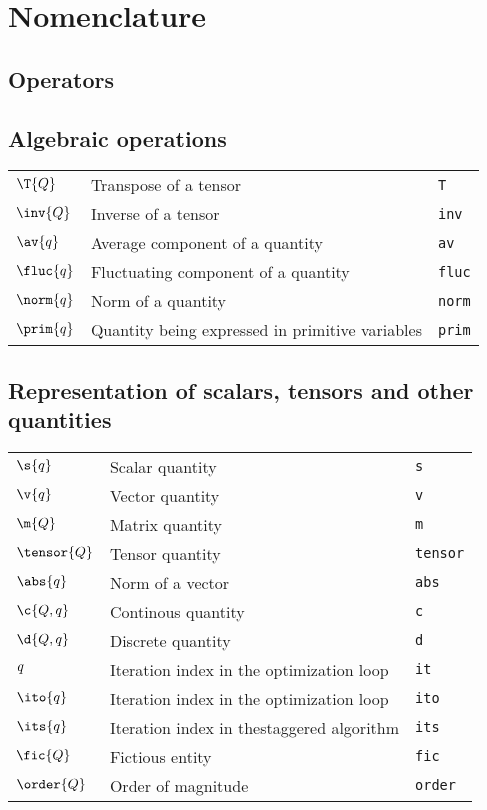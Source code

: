 \section*{Nomenclature}\label{sec:nomenclature}

\subsection*{Operators}

\subsection*{Algebraic operations}
\begin{tabular}{l l l}
$\T{Q}$ & Transpose of a tensor& \texttt{T}\\
$\inv{Q}$ & Inverse of a tensor& \texttt{inv}\\
$\av{q}$ & Average component of a quantity& \texttt{av}\\
$\fluc{q}$ & Fluctuating component of a quantity& \texttt{fluc}\\
$\norm{q}$ & Norm of a quantity& \texttt{norm}\\
$\prim{q}$ & Quantity being expressed in primitive variables& \texttt{prim}\\
\end{tabular}

\subsection*{Representation of scalars, tensors and other quantities}
\begin{tabular}{l l l}
$\s{q}$ & Scalar quantity& \texttt{s}\\
$\v{q}$ & Vector quantity& \texttt{v}\\
$\m{Q}$ & Matrix quantity& \texttt{m}\\
$\tensor{Q}$ & Tensor quantity& \texttt{tensor}\\
$\abs{q}$ & Norm of a vector& \texttt{abs}\\
$\c{Q,q}$ & Continous quantity& \texttt{c}\\
$\d{Q,q}$ & Discrete quantity& \texttt{d}\\
$\it{q}$ & Iteration index in the optimization loop& \texttt{it}\\
$\ito{q}$ & Iteration index in the optimization loop& \texttt{ito}\\
$\its{q}$ & Iteration index in thestaggered algorithm& \texttt{its}\\
$\fic{Q}$ & Fictious entity& \texttt{fic}\\
$\order{Q}$ & Order of magnitude& \texttt{order}\\
\end{tabular}

